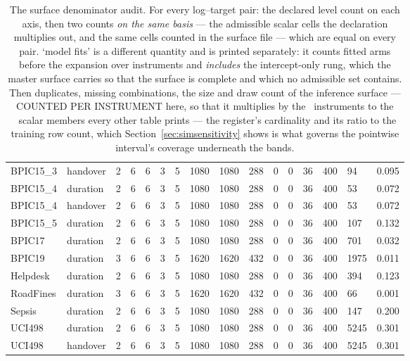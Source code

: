 \begin{landscape}
\begin{table}[t]
{\begin{tabular}{lllllllllllllllr}
BPIC15\_3 & handover & 2 & 6 & 6 & 3 & 5 & 1080 & 1080 & 288 & 0 & 0 & 36 & 400 & 94 & 0.095 \\
BPIC15\_4 & duration & 2 & 6 & 6 & 3 & 5 & 1080 & 1080 & 288 & 0 & 0 & 36 & 400 & 53 & 0.072 \\
BPIC15\_4 & handover & 2 & 6 & 6 & 3 & 5 & 1080 & 1080 & 288 & 0 & 0 & 36 & 400 & 53 & 0.072 \\
BPIC15\_5 & duration & 2 & 6 & 6 & 3 & 5 & 1080 & 1080 & 288 & 0 & 0 & 36 & 400 & 107 & 0.132 \\
BPIC17 & duration & 2 & 6 & 6 & 3 & 5 & 1080 & 1080 & 288 & 0 & 0 & 36 & 400 & 701 & 0.032 \\
BPIC19 & duration & 3 & 6 & 6 & 3 & 5 & 1620 & 1620 & 432 & 0 & 0 & 36 & 400 & 1975 & 0.011 \\
Helpdesk & duration & 2 & 6 & 6 & 3 & 5 & 1080 & 1080 & 288 & 0 & 0 & 36 & 400 & 394 & 0.123 \\
RoadFines & duration & 3 & 6 & 6 & 3 & 5 & 1620 & 1620 & 432 & 0 & 0 & 36 & 400 & 66 & 0.001 \\
Sepsis & duration & 2 & 6 & 6 & 3 & 5 & 1080 & 1080 & 288 & 0 & 0 & 36 & 400 & 147 & 0.200 \\
UCI498 & duration & 2 & 6 & 6 & 3 & 5 & 1080 & 1080 & 288 & 0 & 0 & 36 & 400 & 5245 & 0.301 \\
UCI498 & handover & 2 & 6 & 6 & 3 & 5 & 1080 & 1080 & 288 & 0 & 0 & 36 & 400 & 5245 & 0.301 \\
\bottomrule
\end{tabular}%
}
\caption{The surface denominator audit. For every log--target pair: the declared level count on each axis, then two counts \emph{on the same basis} --- the admissible scalar cells the declaration multiplies out, and the same cells counted in the surface file --- which are equal on every pair. `model fits' is a different quantity and is printed separately: it counts fitted arms before the expansion over instruments and \emph{includes} the intercept-only rung, which the master surface carries so that the surface is complete and which no admissible set contains. Then duplicates, missing combinations, the size and draw count of the inference surface --- COUNTED PER INSTRUMENT here, so that it multiplies by the \nInstruments\ instruments to the \nCellsPerPairMedian\ scalar members every other table prints --- the register's cardinality and its ratio to the training row count, which Section~\ref{sec:simsensitivity} shows is what governs the pointwise interval's coverage underneath the bands.}
\label{tab:denominator}
\end{table}
\end{landscape}
